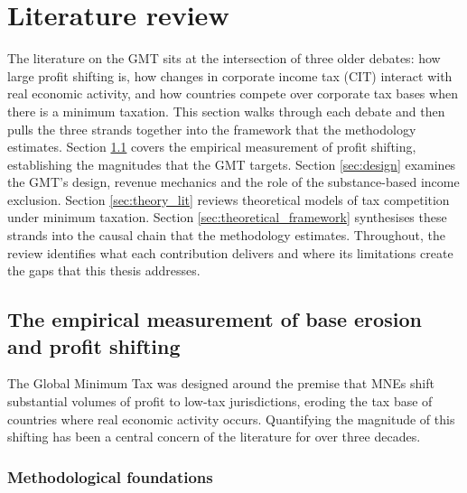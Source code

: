 \documentclass[11pt,a4paper]{article}
\begin{document}
\newpage
\section{Literature review}\label{sec:literature}\label{sec:litreview}

The literature on the GMT sits at the intersection of three older debates: how large profit shifting is, how changes in corporate income tax (CIT) interact with real economic activity, and how countries compete over corporate tax bases when there is a minimum taxation. This section walks through each debate and then pulls the three strands together into the framework that the methodology estimates. Section \ref{sec:beps} covers the empirical measurement of profit shifting, establishing the magnitudes that the GMT targets. Section \ref{sec:design} examines the GMT's design, revenue mechanics and the role of the substance-based income exclusion. Section \ref{sec:theory_lit} reviews theoretical models of tax competition under minimum taxation. Section \ref{sec:theoretical_framework} synthesises these strands into the causal chain that the methodology estimates. Throughout, the review identifies what each contribution delivers and where its limitations create the gaps that this thesis addresses.

\subsection{The empirical measurement of base erosion and profit shifting}\label{sec:beps}

The Global Minimum Tax was designed around the premise that MNEs shift substantial volumes of profit to low-tax jurisdictions, eroding the tax base of countries where real economic activity occurs. Quantifying the magnitude of this shifting has been a central concern of the literature for over three decades.

\subsubsection{Methodological foundations}
\end{document}
